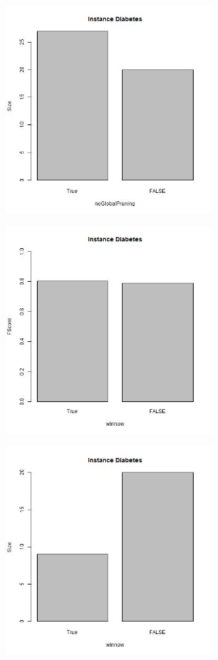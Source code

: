 \documentclass[12pt,a4paper]{article}
\begin{document}
\begin{figure}[H]
\centering
\includegraphics[width=0.7\textwidth]{diabetesSizeNoGlobalPruning.jpg}
\end{figure}

\begin{figure}[H]
\centering
\includegraphics[width=0.7\textwidth]{diabetesFScoreWinnow.jpg}
\end{figure}

\begin{figure}[H]
\centering
\includegraphics[width=0.7\textwidth]{diabetesSizeWinnow.jpg}
\end{figure}
\end{document}
